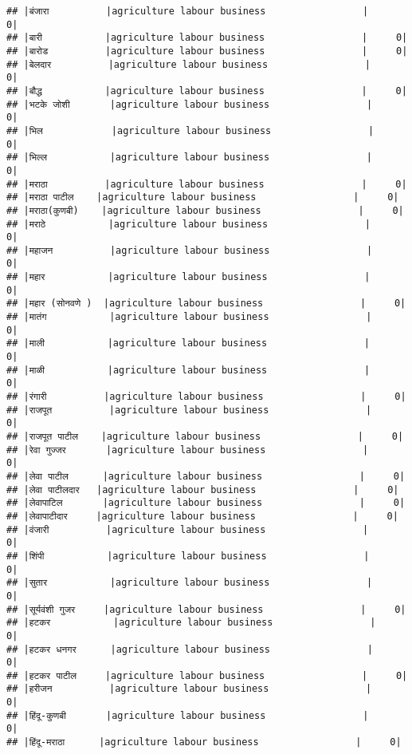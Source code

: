 \documentclass[
]{article}
\begin{document}
\begin{verbatim}
## |बंजारा          |agriculture labour business                 |     0|
## |बारी           |agriculture labour business                 |     0|
## |बारोड          |agriculture labour business                 |     0|
## |बेलदार          |agriculture labour business                 |     0|
## |बौद्ध           |agriculture labour business                 |     0|
## |भटके जोशी       |agriculture labour business                 |     0|
## |भिल            |agriculture labour business                 |     0|
## |भिल्ल           |agriculture labour business                 |     0|
## |मराठा          |agriculture labour business                 |     0|
## |मराठा पाटील    |agriculture labour business                 |     0|
## |मराठा(कुणबी)    |agriculture labour business                 |     0|
## |मराठे           |agriculture labour business                 |     0|
## |महाजन          |agriculture labour business                 |     0|
## |महार           |agriculture labour business                 |     0|
## |महार (सोनवणे )  |agriculture labour business                 |     0|
## |मातंग           |agriculture labour business                 |     0|
## |माली           |agriculture labour business                 |     0|
## |माळी           |agriculture labour business                 |     0|
## |रंगारी          |agriculture labour business                 |     0|
## |राजपूत          |agriculture labour business                 |     0|
## |राजपूत पाटील    |agriculture labour business                 |     0|
## |रेवा गुज्जर       |agriculture labour business                 |     0|
## |लेवा पाटील      |agriculture labour business                 |     0|
## |लेवा पाटीलदार   |agriculture labour business                 |     0|
## |लेवापाटिल       |agriculture labour business                 |     0|
## |लेवापाटीदार     |agriculture labour business                 |     0|
## |वंजारी          |agriculture labour business                 |     0|
## |शिंपी           |agriculture labour business                 |     0|
## |सुतार           |agriculture labour business                 |     0|
## |सूर्यवंशी गुजर     |agriculture labour business                 |     0|
## |हटकर           |agriculture labour business                 |     0|
## |हटकर धनगर      |agriculture labour business                 |     0|
## |हटकर पाटील     |agriculture labour business                 |     0|
## |हरीजन          |agriculture labour business                 |     0|
## |हिंदू-कुणबी       |agriculture labour business                 |     0|
## |हिंदू-मराठा      |agriculture labour business                 |     0|

\end{verbatim}
\end{document}
